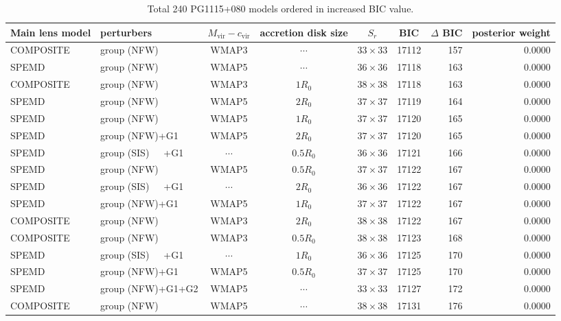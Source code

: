 \documentclass[useAMS,usenatbib]{mnras}
\def\nomicro{$\cdots$}
\def\nodata{$\cdots$}
\begin{document}
\begin{table}
    \centering
    \caption{Total 240 PG1115+080 models ordered in increased BIC value.}
    \label{tab:6TD_2}
    \begin{tabular}{llccccrr}
        \hline
        Main lens model & perturbers &$M_{\textrm{vir}}-c_{\textrm{vir}}$& accretion disk size & $S_{r}$ & BIC & $\Delta$ BIC & posterior weight\\
        \hline
        COMPOSITE & group (NFW)       &WMAP3 & \nomicro&$33\times33$ & 17112 & 157 & 0.0000\\
        SPEMD     & group (NFW)       &WMAP5 & \nomicro&$36\times36$ & 17118 & 163 & 0.0000\\
        COMPOSITE & group (NFW)       &WMAP3 & $1R_{0}$&$38\times38$ & 17118 & 163 & 0.0000\\
        SPEMD     & group (NFW)       &WMAP5 & $2R_{0}$&$37\times37$ & 17119 & 164 & 0.0000\\
        SPEMD     & group (NFW)       &WMAP5 & $1R_{0}$&$37\times37$ & 17120 & 165 & 0.0000\\
        SPEMD     & group (NFW)+G1    &WMAP5 & $2R_{0}$&$37\times37$ & 17120 & 165 & 0.0000\\
        SPEMD     & group (SIS)~~~+G1 &\nodata & $0.5R_{0}$&$36\times36$ & 17121 & 166 & 0.0000\\
        SPEMD     & group (NFW)       &WMAP5 & $0.5R_{0}$&$37\times37$ & 17122 & 167 & 0.0000\\
        SPEMD     & group (SIS)~~~+G1 &\nodata & $2R_{0}$&$36\times36$ & 17122 & 167 & 0.0000\\
        SPEMD     & group (NFW)+G1    &WMAP5 & $1R_{0}$&$37\times37$ & 17122 & 167 & 0.0000\\
        COMPOSITE & group (NFW)       &WMAP3 & $2R_{0}$&$38\times38$ & 17122 & 167 & 0.0000\\
        COMPOSITE & group (NFW)       &WMAP3 & $0.5R_{0}$&$38\times38$ & 17123 & 168 & 0.0000\\
        SPEMD     & group (SIS)~~~+G1 &\nodata& $1R_{0}$&$36\times36$ & 17125 & 170 & 0.0000\\
        SPEMD     & group (NFW)+G1    &WMAP5 & $0.5R_{0}$&$37\times37$ & 17125 & 170 & 0.0000\\
        SPEMD     & group (NFW)+G1+G2 &WMAP5 & \nomicro&$33\times33$ & 17127 & 172 & 0.0000\\
        COMPOSITE & group (NFW)       &WMAP5 & \nomicro&$38\times38$ & 17131 & 176 & 0.0000\\

\end{tabular}
\end{table}
\end{document}
